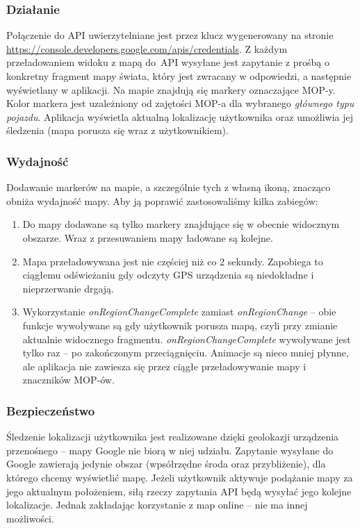 \subsubsection{Działanie}
Połączenie do API uwierzytelniane jest przez klucz wygenerowany na stronie \url{https://console.developers.google.com/apis/credentials}. Z każdym przeładowaniem widoku z mapą do~API wysyłane jest zapytanie z prośbą o konkretny fragment mapy świata, który jest zwracany w odpowiedzi, a następnie wyświetlany w aplikacji. Na mapie znajdują się markery oznaczające MOP-y. Kolor markera jest uzależniony od zajętości MOP-a dla wybranego \textit{głównego typu pojazdu}. Aplikacja wyświetla aktualną lokalizację użytkownika oraz umożliwia jej śledzenia (mapa porusza się wraz z użytkownikiem). 
\subsubsection{Wydajność}
Dodawanie markerów na mapie, a szczególnie tych z własną ikoną, znacząco obniża wydajność mapy. Aby ją poprawić zastosowaliśmy kilka zabiegów:
\begin{enumerate}
\item Do mapy dodawane są tylko markery znajdujące się w obecnie widocznym obszarze. Wraz z przesuwaniem mapy ładowane są kolejne.
\item Mapa przeładowywana jest nie częściej niż co 2 sekundy. Zapobiega to ciągłemu odświeżaniu gdy odczyty GPS urządzenia są niedokładne i nieprzerwanie drgają.
\item Wykorzystanie \textit{onRegionChangeComplete} zamiast \textit{onRegionChange} -- obie funkcje wywoływane są gdy użytkownik porusza mapą, czyli przy zmianie aktualnie widocznego fragmentu. \textit{onRegionChangeComplete} wywoływane jest tylko raz -- po zakończonym przeciągnięciu. Animacje są nieco mniej płynne, ale aplikacja nie zawiesza się przez ciągłe przeładowywanie mapy i znaczników MOP-ów.
\end{enumerate}
\subsubsection{Bezpieczeństwo}
Śledzenie lokalizacji użytkownika jest realizowane dzięki geolokazji urządzenia przenośnego -- mapy Google nie biorą w niej udziału. Zapytanie wysyłane do Google zawierają jedynie obszar (wpsółrzędne środa oraz przybliżenie), dla którego chcemy wyświetlić mapę. Jeżeli użytkownik aktywuje podążanie mapy za jego aktualnym położeniem, siłą rzeczy zapytania API będą wysyłać jego kolejne lokalizacje. Jednak zakładając korzystanie z map online -- nie ma innej możliwości. 

